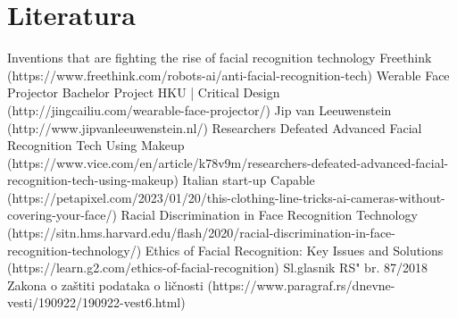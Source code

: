 \documentclass{article}
\begin{document}
\section{Literatura}
\begin{enumerate}
  \setcounter{enumi}{0}
  \renewcommand{\labelenumi}{[\arabic{enumi}]}
  
  Inventions that are fighting the rise of facial recognition technology Freethink (https://www.freethink.com/robots-ai/anti-facial-recognition-tech)
   Werable Face Projector Bachelor Project HKU | Critical Design (http://jingcailiu.com/wearable-face-projector/)
   Jip van Leeuwenstein (http://www.jipvanleeuwenstein.nl/)
   Researchers Defeated Advanced Facial Recognition Tech Using Makeup (https://www.vice.com/en/article/k78v9m/researchers-defeated-advanced-facial-recognition-tech-using-makeup)
   Italian start-up Capable (https://petapixel.com/2023/01/20/this-clothing-line-tricks-ai-cameras-without-covering-your-face/)
   Racial Discrimination in Face Recognition Technology (https://sitn.hms.harvard.edu/flash/2020/racial-discrimination-in-face-recognition-technology/)
   Ethics of Facial Recognition: Key Issues and Solutions (https://learn.g2.com/ethics-of-facial-recognition)
   Sl.glasnik RS" br. 87/2018 Zakona o zaštiti podataka o ličnosti (https://www.paragraf.rs/dnevne-vesti/190922/190922-vest6.html)
\end{enumerate}
\newpage
\end{document}
